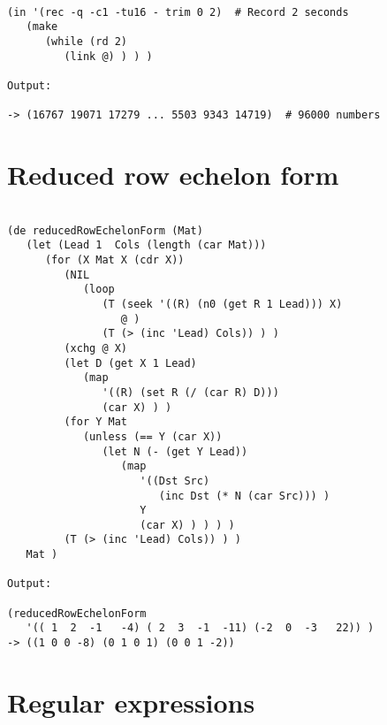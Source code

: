 \begin{verbatim}

(in '(rec -q -c1 -tu16 - trim 0 2)  # Record 2 seconds
   (make
      (while (rd 2)
         (link @) ) ) )

Output:

-> (16767 19071 17279 ... 5503 9343 14719)  # 96000 numbers

\end{verbatim}

\section*{Reduced row echelon form}

\begin{verbatim}

(de reducedRowEchelonForm (Mat)
   (let (Lead 1  Cols (length (car Mat)))
      (for (X Mat X (cdr X))
         (NIL
            (loop
               (T (seek '((R) (n0 (get R 1 Lead))) X)
                  @ )
               (T (> (inc 'Lead) Cols)) ) )
         (xchg @ X)
         (let D (get X 1 Lead)
            (map
               '((R) (set R (/ (car R) D)))
               (car X) ) )
         (for Y Mat
            (unless (== Y (car X))
               (let N (- (get Y Lead))
                  (map
                     '((Dst Src)
                        (inc Dst (* N (car Src))) )
                     Y
                     (car X) ) ) ) )
         (T (> (inc 'Lead) Cols)) ) )
   Mat )

Output:

(reducedRowEchelonForm
   '(( 1  2  -1   -4) ( 2  3  -1  -11) (-2  0  -3   22)) )
-> ((1 0 0 -8) (0 1 0 1) (0 0 1 -2))

\end{verbatim}

\section*{Regular expressions}

